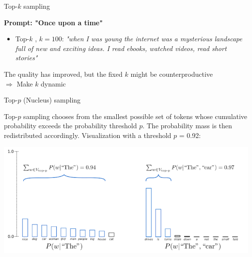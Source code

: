 
\begin{vbframe}{Top-$k$ sampling}

\vfill

\textbf{Prompt: "Once upon a time"}
\begin{itemize}
    \item Top-$k$ , $k = 100$: \textit{"when I was young the internet was a mysterious landscape full of new and exciting ideas. I read ebooks, watched videos, read short stories"}
\end{itemize}
\vspace{2ex}

The quality has improved, but the fixed $k$ might be counterproductive\\
\vspace{2ex}
$\Rightarrow$ Make $k$ dynamic        


\end{vbframe}


\begin{vbframe}{Top-$p$ (Nucleus) sampling }


Top-$p$ sampling chooses from the smallest possible set of tokens whose cumulative probability exceeds the probability threshold $p$. The probability mass is then redistributed accordingly.
Visualization with a threshold $p$ = 0.92:

\begin{center}
\includegraphics[width=1.0\linewidth]{figure/nucleus.png}
\end{center}

\end{vbframe}

